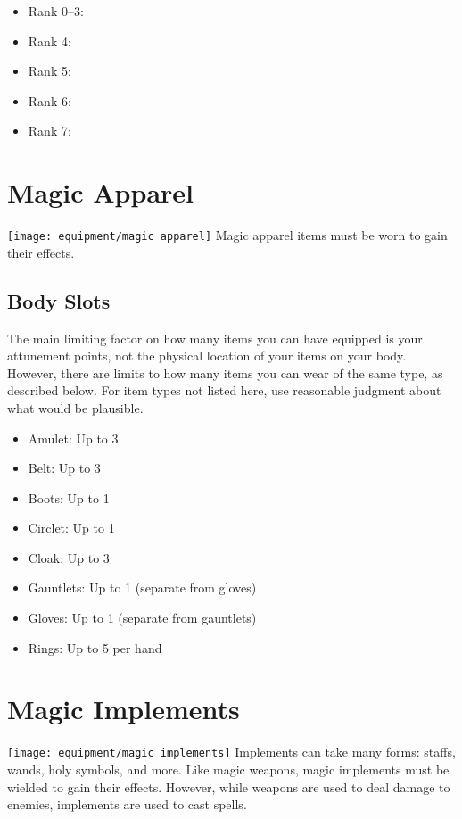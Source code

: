         \begin{itemize}
            \item Rank 0--3: 
            \item Rank 4: 
            \item Rank 5: 
            \item Rank 6: 
            \item Rank 7: 
        \end{itemize}


    

    

\newpage
\section{Magic Apparel}
    \texttt{[image: equipment/magic apparel]}
    Magic apparel items must be worn to gain their effects.

    \subsection{Body Slots}
        The main limiting factor on how many items you can have equipped is your attunement points, not the physical location of your items on your body.
        However, there are limits to how many items you can wear of the same type, as described below.
        For item types not listed here, use reasonable judgment about what would be plausible.
        \begin{itemize}
            \item Amulet: Up to 3
            \item Belt: Up to 3
            \item Boots: Up to 1
            \item Circlet: Up to 1
            \item Cloak: Up to 3
            \item Gauntlets: Up to 1 (separate from gloves)
            \item Gloves: Up to 1 (separate from gauntlets)
            \item Rings: Up to 5 per hand
        \end{itemize}

    

    

\newpage
\section{Magic Implements}\label{Implements}
    \texttt{[image: equipment/magic implements]}
    Implements can take many forms: staffs, wands, holy symbols, and more.
    Like magic weapons, magic implements must be wielded to gain their effects.
    However, while weapons are used to deal damage to enemies, implements are used to cast spells.

